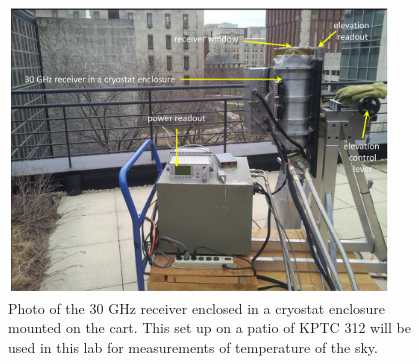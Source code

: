 \begin{figure}[ht]
	\begin{center}
		\includegraphics[trim=0pt 0pt 0pt 0pt,width=0.9\textwidth]{cmb/receiver_setup_new.pdf}
		\caption{Photo of the 30 GHz receiver enclosed in a cryostat enclosure mounted on the cart. This set up on a patio of KPTC 312 will be used in this lab for measurements of temperature of the sky.}
		\label{fig:CMBLab-photo}
	\end{center}
\end{figure}

